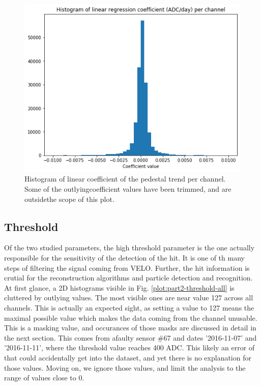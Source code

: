 \begin{figure}
    \centering
    \includegraphics[width=0.7\linewidth]{figures/chapter4/calib_analysis/Part1-pedestal-trend.png}
    \caption{Histogram of linear coefficient of the pedestal trend per channel. Some of the outlyingcoefficient values have been trimmed,  and are outsidethe scope of this plot.}
    \label{plot:part1-pedestal-trend}
\end{figure}

\subsection{Threshold}

Of the two studied parameters, the high threshold parameter is the one actually responsible for the sensitivity of the detection of the hit. It is one of th many steps of filtering the signal coming from VELO. Further, the hit information is crutial for the reconstruction algorithms and particle detection and recognition. 
At first glance, a 2D histograms visible in Fig. \ref{plot:part2-threshold-all} is cluttered by outlying values. 
The most visible ones are near value 127 across all channels. This is actually an expected sight, as setting a value to 127 means the maximal possible value which makes the data coming from the channel unusable. This is a masking value, and occurances of those masks are discussed in detail in the next section. 
This comes from afaulty  sensor  \#67  and  dates  ’2016-11-07’  and  ’2016-11-11’,  where  the  threshold  value  reaches  400  ADC. This likely an error of that could accidentally get into the dataset, and yet there is no explanation for those values.
Moving on, we ignore those values, and limit the analysis to the range of values close to 0.

